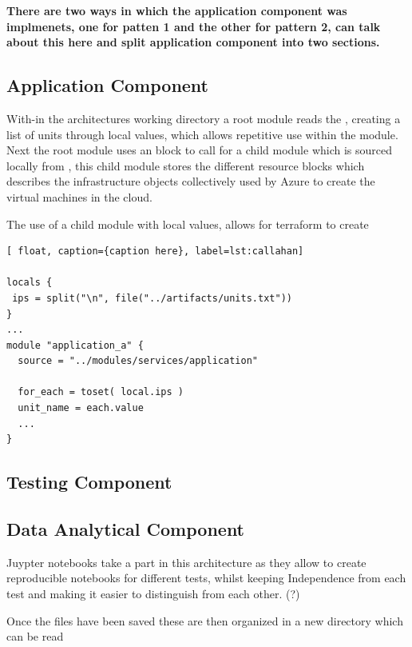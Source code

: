 \textbf{There are two ways in which the application component was implmenets, one for patten 1 and the other for pattern 2, can talk about this here and split application component into two sections. }
\subsection{Application Component}
With-in the architectures working directory a root module  reads the , creating a list of units through local values, which allows repetitive use within the module. Next the root module uses an  block to call for a child module which is sourced locally from , this child module stores the different resource blocks which describes the infrastructure objects collectively used by Azure to create the virtual machines in the cloud. 

The use of a child module with local values, allows for terraform to create 

\begin{lstlisting}[ float, caption={caption here}, label=lst:callahan]
  
locals {
 ips = split("\n", file("../artifacts/units.txt"))
}
...
module "application_a" {
  source = "../modules/services/application"

  for_each = toset( local.ips )
  unit_name = each.value
  ...
}

\end{lstlisting}

\subsection{Testing Component}

\subsection{Data Analytical Component}
Juypter notebooks take a part in this architecture as they allow to create reproducible notebooks for different tests, whilst keeping Independence from each test and making it easier to distinguish from each other. (?)

Once the files have been saved these are then organized in a new directory which can be read




